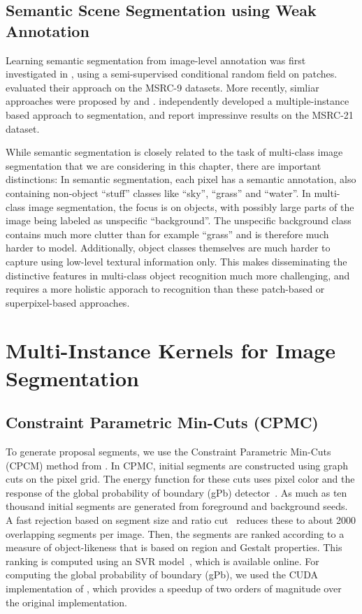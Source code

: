 \subsection{Semantic Scene Segmentation using Weak Annotation}
Learning semantic segmentation from image-level annotation was first investigated in \citet{verbeek2007region},
using a semi-supervised conditional random field on patches. \citet{verbeek2007region} evaluated their approach
on the MSRC-9 datasets.
More recently, simliar approaches were proposed by
\citet{vezhnevets2011weakly} and \citet{vezhnevets2010towards}.
\citet{vezhnevets2011weakly} independently developed a multiple-instance based
approach to segmentation, and report impressinve results on the MSRC-21 dataset.

While semantic segmentation is closely related to the task of multi-class image
segmentation that we are considering in this chapter, there are important
distinctions: In semantic segmentation, each pixel has a semantic annotation,
also containing non-object ``stuff'' classes like ``sky'', ``grass'' and
``water''. In multi-class image segmentation, the focus is on objects, with
possibly large parts of the image being labeled as unspecific ``background''.
The unspecific background class contains much more clutter than for example
``grass'' and is therefore much harder to model. Additionally, object classes
themselves are much harder to capture using low-level textural information
only.  This makes disseminating the distinctive features in multi-class object
recognition much more challenging, and requires a more holistic apporach to
recognition than these patch-based or superpixel-based approaches.


\section{Multi-Instance Kernels for Image Segmentation}
\subsection{Constraint Parametric Min-Cuts (CPMC)}
To generate proposal segments, we use the Constraint Parametric Min-Cuts (CPCM)
method from \citet{carreira2010constrained}. In CPMC, initial segments are
constructed using graph cuts on the pixel grid. The energy function for these cuts
uses pixel color and the response of the global probability of boundary (gPb)
detector~\citep{maire2008using}. As much as ten thousand initial segments are
generated from foreground and background seeds. A fast rejection based on
segment size and ratio cut~\citep{wang2003image} reduces these to about 2000
overlapping segments per image. Then, the segments are ranked according to a
measure of object-likeness that is based on region and Gestalt properties.
This ranking is computed using an SVR model~\citep{carreira2010constrained},
which is available online. 
For computing the global probability of boundary
(gPb), we used the CUDA implementation of \citet{catanzaro2009efficient}, which
provides a speedup of two orders of magnitude over the original implementation.

